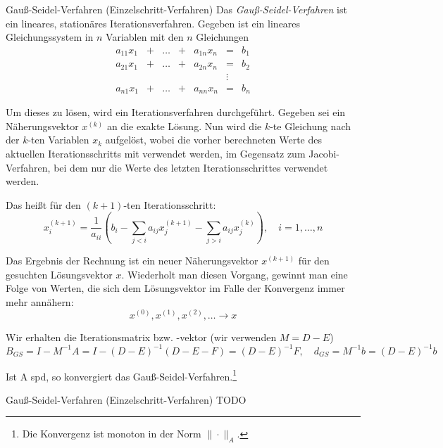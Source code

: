 \begin{defi}{Gauß-Seidel-Verfahren (Einzelschritt-Verfahren)}
    Das \emph{Gauß-Seidel-Verfahren} ist ein lineares, stationäres Iterationsverfahren.
    Gegeben ist ein lineares Gleichungssystem in $n$ Variablen mit den $n$ Gleichungen
    \[
        \begin{matrix}
            a_{11} x_1 & + & \ldots & + & a_{1n} x_n & =      & b_1 \\
            a_{21} x_1 & + & \ldots & + & a_{2n} x_n & =      & b_2 \\
                       &   &        &   &            & \vdots &     \\
            a_{n1} x_1 & + & \ldots & + & a_{nn} x_n & =      & b_n
        \end{matrix}
    \]

    Um dieses zu lösen, wird ein Iterationsverfahren durchgeführt.
    Gegeben sei ein Näherungsvektor $x^{(k)}$ an die exakte Lösung.
    Nun wird die $k$-te Gleichung nach der $k$-ten Variablen $x_k$ aufgelöst, wobei die vorher berechneten Werte des aktuellen Iterationsschritts mit verwendet werden, im Gegensatz zum Jacobi-Verfahren, bei dem nur die Werte des letzten Iterationsschrittes verwendet werden.

    Das heißt für den $(k+1)$-ten Iterationsschritt:
    \[
        x_i^{(k+1)} = \frac{1}{a_{ii}} \left( b_i - \sum_{j < i} a_{ij} x_j^{(k+1)} - \sum_{j > i} a_{ij} x_j^{(k)} \right), \quad i = 1, \ldots, n
    \]

    Das Ergebnis der Rechnung ist ein neuer Näherungsvektor $x^{(k+1)}$ für den gesuchten Lösungsvektor $x$.
    Wiederholt man diesen Vorgang, gewinnt man eine Folge von Werten, die sich dem Lösungsvektor im Falle der Konvergenz immer mehr annähern:
    \[
        x^{(0)}, x^{(1)}, x^{(2)}, \ldots \to x
    \]

    Wir erhalten die Iterationsmatrix bzw. -vektor (wir verwenden $M = D - E$)
    \[
        B_{GS} = I - M^{-1} A = I - (D - E)^{-1} (D - E - F) = (D - E)^{-1} F, \quad d_{GS} = M^{-1} b = (D - E)^{-1} b
    \]

    Ist A spd, so konvergiert das Gauß-Seidel-Verfahren.\footnote{Die Konvergenz ist monoton in der Norm $\| \cdot \|_A$.}
\end{defi}

\begin{example}{Gauß-Seidel-Verfahren (Einzelschritt-Verfahren)}
    TODO
\end{example}

